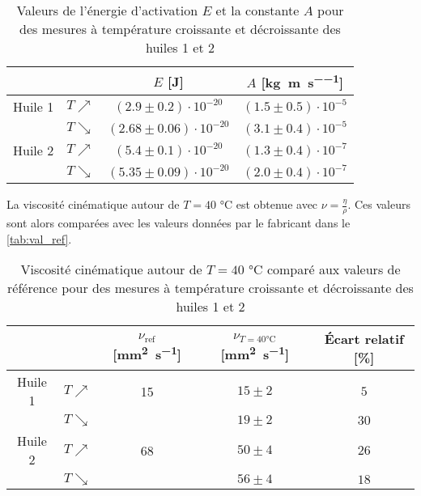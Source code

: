\begin{table}[h]
    \centering
    \begin{tabulary}{0.8\linewidth}{C C|C C}
        \toprule
        & & \(E\) [\si{\joule}] & \(A\) [\si{\kilo\gram\per\meter\per\second}] \\
        \midrule
        Huile 1 & \(T \nearrow\) & \((2.9 \pm 0.2) \cdot 10^{-20}\) & \((1.5 \pm 0.5) \cdot 10^{-5}\) \\
        & \(T \searrow\) & \((2.68 \pm 0.06) \cdot 10^{-20}\) & \((3.1 \pm 0.4) \cdot 10^{-5}\) \\
        \midrule
        Huile 2 & \(T \nearrow\) & \((5.4 \pm 0.1) \cdot 10^{-20}\) & \((1.3 \pm 0.4) \cdot 10^{-7}\) \\
        & \(T \searrow\) & \((5.35 \pm 0.09) \cdot 10^{-20}\) & \((2.0 \pm 0.4) \cdot 10^{-7}\) \\
        \bottomrule
    \end{tabulary}
    \caption{Valeurs de l'énergie d'activation \(E\) et la constante \(A\) pour des mesures à température croissante et décroissante des huiles 1 et 2}
    \label{tab:energie_fit}
\end{table}

La viscosité cinématique autour de \(T = 40\) \si{\celsius} est obtenue avec \(\nu = \frac{\eta}{\rho}\). Ces valeurs sont alors comparées avec les valeurs données par le fabricant dans le \autoref{tab:val_ref}.

\begin{table}[h]
    \centering
    \begin{tabulary}{0.8\linewidth}{C C|C|C C}
        \toprule
        & & \(\nu_\textrm{ref}\) [\si{\square\milli\meter\per\second}] & \(\nu_{T=40 \si{\celsius}}\) [\si{\square\milli\meter\per\second}] & Écart relatif [\%] \\
        \midrule
        Huile 1 & \(T \nearrow\) & 15 & \(15 \pm 2\) & \(5\) \\
        & \(T \searrow\) &  & \(19 \pm 2\) & \(30\) \\
        \midrule
        Huile 2 & \(T \nearrow\) & 68 & \(50 \pm 4\) & \(26\)\\
        & \(T \searrow\) &  & \(56 \pm 4\) & \(18\) \\
        \bottomrule
    \end{tabulary}
    \caption{Viscosité cinématique autour de \(T = 40\) \si{\celsius} comparé aux valeurs de référence \cite{val_ref} pour des mesures à température croissante et décroissante des huiles 1 et 2}
    \label{tab:val_ref}
\end{table}
